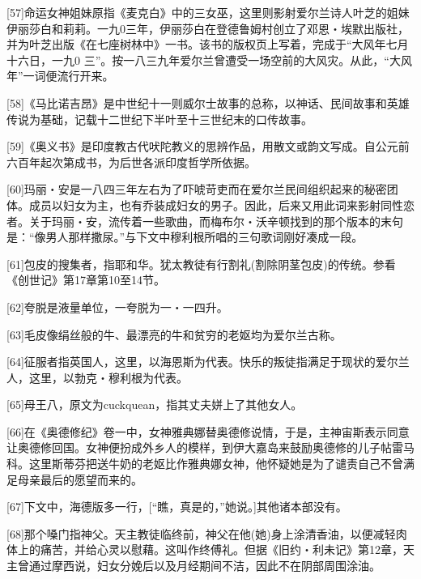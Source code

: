 \documentclass{article}
\begin{document}
[57]命运女神姐妹原指《麦克白》中的三女巫，这里则影射爱尔兰诗人叶芝的姐妹伊丽莎白和莉莉。一九0三年，伊丽莎白在登德鲁姆村创立了邓恩・埃默出版社，并为叶芝出版《在七座树林中》一书。该书的版权页上写着，完成于“大风年七月十六日，一九0 三”。按一八三九年爱尔兰曾遭受一场空前的大风灾。从此，“大风年”一词便流行开来。



[58]《马比诺吉昂》是中世纪十一则威尔士故事的总称，以神话、民间故事和英雄传说为基础，记载十二世纪下半叶至十三世纪末的口传故事。



[59]《奥义书》是印度教古代吠陀教义的思辨作品，用散文或韵文写成。自公元前六百年起次第成书，为后世各派印度哲学所依据。



[60]玛丽・安是一八四三年左右为了吓唬苛吏而在爱尔兰民间组织起来的秘密团体。成员以妇女为主，也有乔装成妇女的男子。因此，后来又用此词来影射同性恋者。关于玛丽・安，流传着一些歌曲，而梅布尔・沃辛顿找到的那个版本的末句是：“像男人那样撒尿。”与下文中穆利根所唱的三句歌词刚好凑成一段。



[61]包皮的搜集者，指耶和华。犹太教徒有行割礼(割除阴茎包皮)的传统。参看《创世记》第17章第10至14节。



[62]夸脱是液量单位，一夸脱为一・一四升。



[63]毛皮像绢丝般的牛、最漂亮的牛和贫穷的老妪均为爱尔兰古称。



[64]征服者指英国人，这里，以海恩斯为代表。快乐的叛徒指满足于现状的爱尔兰人，这里，以勃克・穆利根为代表。



[65]母王八，原文为cuckquean，指其丈夫姘上了其他女人。



[66]在《奥德修纪》卷一中，女神雅典娜替奥德修说情，于是，主神宙斯表示同意让奥德修回国。女神便扮成外乡人的模样，到伊大嘉岛来鼓励奥德修的儿子帖雷马科。这里斯蒂芬把送牛奶的老妪比作雅典娜女神，他怀疑她是为了谴责自己不曾满足母亲最后的愿望而来的。



[67]下文中，海德版多一行，[“瞧，真是的，”她说。]其他诸本部没有。



[68]那个嗓门指神父。天主教徒临终前，神父在他(她)身上涂清香油，以便减轻肉体上的痛苦，并给心灵以慰藉。这叫作终傅礼。但据《旧约・利未记》第12章，天主曾通过摩西说，妇女分娩后以及月经期间不洁，因此不在阴部周围涂油。
\end{document}

